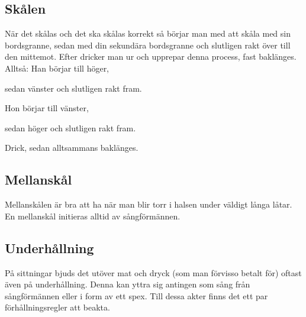 \subsection*{Skålen}

När det skålas och det ska skålas korrekt så börjar man 
med att skåla med sin bordsgranne, sedan med din sekundära 
bordsgranne och slutligen rakt över till den mittemot. 
Efter dricker man ur och upprepar denna process, fast baklänges.
\\

Alltså:
Han börjar till höger,

sedan vänster och slutligen rakt fram.

Hon börjar till vänster,

sedan höger och slutligen rakt fram.

Drick, sedan alltsammans baklänges.
\\

\subsection*{Mellanskål}


Mellanskålen är bra att ha när man blir torr i halsen under väldigt långa låtar. 
En mellanskål initieras alltid av sångförmännen.

\newpage

\subsection*{Underhållning}
På sittningar bjuds det utöver mat och dryck (som man förvisso betalt för) oftast även på underhållning.
Denna kan yttra sig antingen som sång från sångförmännen eller i form av ett spex.
Till dessa akter finns det ett par förhållningsregler att beakta.
\\

